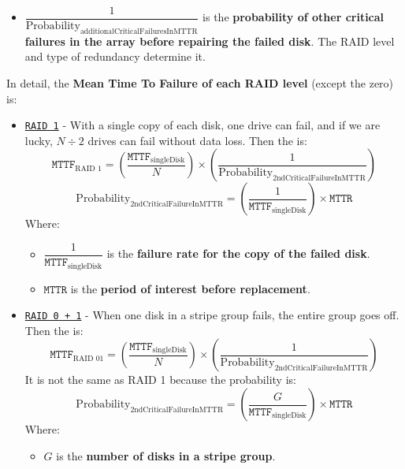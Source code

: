 \begin{itemize}
\begin{itemize}
        \item $\dfrac{1}{\text{Probability}_{\text{additionalCriticalFailuresInMTTR}}}$ is the \textbf{probability of other critical failures in the array before repairing the failed disk}. The RAID level and type of redundancy determine it.
    \end{itemize}
    In detail, the \textbf{Mean Time To Failure of each RAID level} (except the zero) is:
    \begin{itemize}
        \item \texttt{\underline{RAID 1}} - With a single copy of each disk, one drive can fail, and if we are lucky, $N \div 2$ drives can fail without data loss. Then the  is:
        \begin{equation}
            \texttt{MTTF}_{\text{RAID 1}} = \left(
                \dfrac{\texttt{MTTF}_{\text{singleDisk}}}{N}
            \right) \times \left(
                \dfrac{1}{\text{Probability}_{\text{2ndCriticalFailureInMTTR}}}
            \right)
        \end{equation}
        \begin{equation}
            \text{Probability}_{\text{2ndCriticalFailureInMTTR}} = \left(\dfrac{1}{\texttt{MTTF}_{\text{singleDisk}}}\right) \times \texttt{MTTR}
        \end{equation}
        Where:
        \begin{itemize}
            \item $\dfrac{1}{\texttt{MTTF}_{\text{singleDisk}}}$ is the \textbf{failure rate for the copy of the failed disk}.
            
            \item $\texttt{MTTR}$ is the \textbf{period of interest before replacement}.
        \end{itemize}


        \item \texttt{\underline{RAID 0 + 1}} - When one disk in a stripe group fails, the entire group goes off. Then the  is:
        \begin{equation}
            \texttt{MTTF}_{\text{RAID 01}} = \left(
                \dfrac{\texttt{MTTF}_{\text{singleDisk}}}{N}
            \right) \times \left(
                \dfrac{1}{\text{Probability}_{\text{2ndCriticalFailureInMTTR}}}
            \right)
        \end{equation}
        It is not the same as RAID 1 because the probability is:
        \begin{equation}
            \text{Probability}_{\text{2ndCriticalFailureInMTTR}} = \left(\dfrac{G}{\texttt{MTTF}_{\text{singleDisk}}}\right) \times \texttt{MTTR}
        \end{equation}
        Where:
        \begin{itemize}
            \item $G$ is the \textbf{number of disks in a stripe group}.


\end{itemize}
\end{itemize}
\end{itemize}

